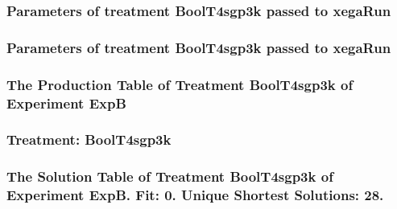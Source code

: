 \documentclass[18pt,c]{beamer}
\begin{document}

 \begin{frame}
 \fontsize{8pt}{9pt}\selectfont
 \frametitle{  Parameters of treatment BoolT4sgp3k passed to xegaRun
 }

 \label{ExpBtParmTable086.tex}  
 \end{frame}


 \begin{frame}
 \fontsize{8pt}{9pt}\selectfont
 \frametitle{  Parameters of treatment BoolT4sgp3k passed to xegaRun
 }

 \label{ExpBtParmTable087.tex}  
 \end{frame}

 \begin{frame}
 \fontsize{8pt}{9pt}\selectfont
 \frametitle{ The Production Table of Treatment BoolT4sgp3k of Experiment ExpB }

 \label{ExpBGrammarTable027.tex}  
 \end{frame}

 \begin{frame}
 \fontsize{8pt}{9pt}\selectfont
 \frametitle{ Treatment: BoolT4sgp3k }

 \label{ExpBStatsTable028.tex}  
 \end{frame}

 \begin{frame}
 \fontsize{8pt}{9pt}\selectfont
 \frametitle{ The Solution Table of Treatment BoolT4sgp3k of Experiment ExpB. Fit: 0. Unique Shortest Solutions: 28. }

 \label{ExpBSolutionTable021.tex}  
 \end{frame}
\end{document}
